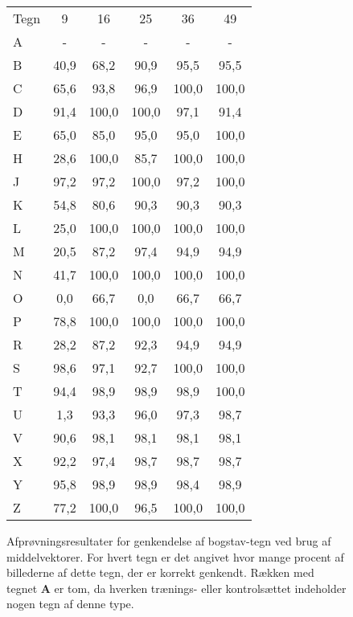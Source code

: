\begin{figure}[htp]
\centering
\begin{tabular}{|l|c|c|c|c|c|}\hline
\rowcolor[gray]{0.9} \multicolumn{6}{|>{\columncolor[gray]{0.9}}c|}{\textbf{Middelvektor}} \\ \hline
Tegn & 9 & 16 & 25 & 36 & 49\\\hline
A & - & - & - & - & -\\\hline
B & 40,9 & 68,2 & 90,9 & 95,5 & 95,5\\\hline
C & 65,6 & 93,8 & 96,9 & 100,0 & 100,0\\\hline
D & 91,4 & 100,0 & 100,0 & 97,1 & 91,4\\\hline
E & 65,0 & 85,0 & 95,0 & 95,0 & 100,0\\\hline
H & 28,6 & 100,0 & 85,7 & 100,0 & 100,0\\\hline
J & 97,2 & 97,2 & 100,0 & 97,2 & 100,0\\\hline
K & 54,8 & 80,6 & 90,3 & 90,3 & 90,3\\\hline
L & 25,0 & 100,0 & 100,0 & 100,0 & 100,0\\\hline
M & 20,5 & 87,2 & 97,4 & 94,9 & 94,9\\\hline
N & 41,7 & 100,0 & 100,0 & 100,0 & 100,0\\\hline
O & 0,0 & 66,7 & 0,0    & 66,7 & 66,7\\\hline
P & 78,8 & 100,0 & 100,0 & 100,0 & 100,0\\\hline
R & 28,2 & 87,2 & 92,3 & 94,9 & 94,9\\\hline
S & 98,6 & 97,1 & 92,7 & 100,0 & 100,0\\\hline
T & 94,4 & 98,9 & 98,9 & 98,9 & 100,0\\\hline
U & 1,3 & 93,3 & 96,0 & 97,3 & 98,7\\\hline
V & 90,6 & 98,1 & 98,1 & 98,1 & 98,1\\\hline
X & 92,2 & 97,4 & 98,7 & 98,7 & 98,7\\\hline
Y & 95,8 & 98,9 & 98,9 & 98,4 & 98,9\\\hline
Z & 77,2 & 100,0 & 96,5 & 100,0 & 100,0\\\hline
\end{tabular}
\caption{Afprøvningsresultater for genkendelse af bogstav-tegn ved brug af middelvektorer. For hvert tegn er det angivet hvor mange procent af billederne af dette tegn, der er korrekt genkendt. Rækken med tegnet \textbf{A} er tom, da hverken trænings- eller kontrolsættet indeholder nogen tegn af denne type.}
\label{fig:test:middel_bogstav}
\end{figure}

